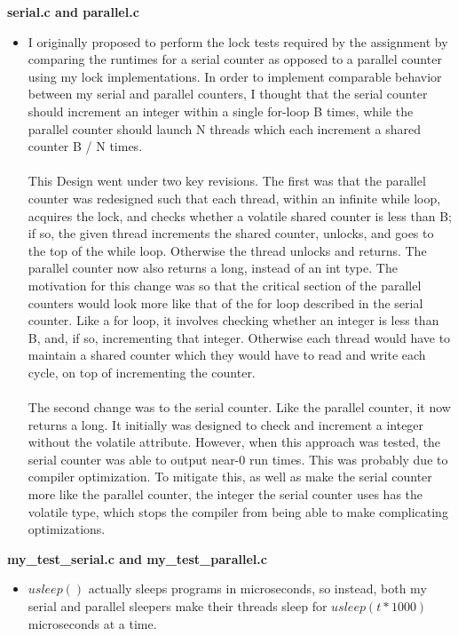 \documentclass[]{article}
\begin{document}
\begin{itemize}
	\textbf{serial.c and parallel.c}
	\begin{itemize}
		\item I originally proposed to perform the lock tests required by the assignment by comparing the runtimes for a serial counter as opposed to a parallel counter using my lock implementations. In order to implement comparable behavior between my serial and parallel counters, I thought that the serial counter should increment an integer within a single for-loop B times, while the parallel counter should launch N threads which each increment a shared counter B / N times.
		\\\\
		This Design went under two key revisions. The first was that the parallel counter was redesigned such that each thread, within an infinite while loop, acquires the lock, and checks whether a volatile shared counter is less than B; if so, the given thread increments the shared counter, unlocks, and goes to the top of the while loop. Otherwise the thread unlocks and returns. 
		The parallel counter now also returns a long, instead of an int type.
		The motivation for this change was so that the critical section of the parallel counters would look more like that of the for loop described in the serial counter. Like a for loop, it involves checking whether an integer is less than B, and, if so, incrementing that integer. Otherwise each thread would have to maintain a shared counter which they would have to read and write each cycle, on top of incrementing the counter.
		\\\\
		The second change was to the serial counter. Like the parallel counter, it now returns a long. It initially was designed to check and increment a integer without the volatile attribute. However, when this approach was tested, the serial counter was able to output near-0 run times. This was probably due to compiler optimization. To mitigate this, as well as make the serial counter more like the parallel counter, the integer the serial counter uses has the volatile type, which stops the compiler from being able to make complicating optimizations.
	\end{itemize}
	\textbf{my\_test\_serial.c and my\_test\_parallel.c}
	\begin{itemize}
		\item $usleep()$ actually sleeps programs in microseconds, so instead, both my serial and parallel sleepers make their threads sleep for $usleep(t * 1000)$ microseconds at a time.
		

\end{itemize}
\end{itemize}
\end{document}
